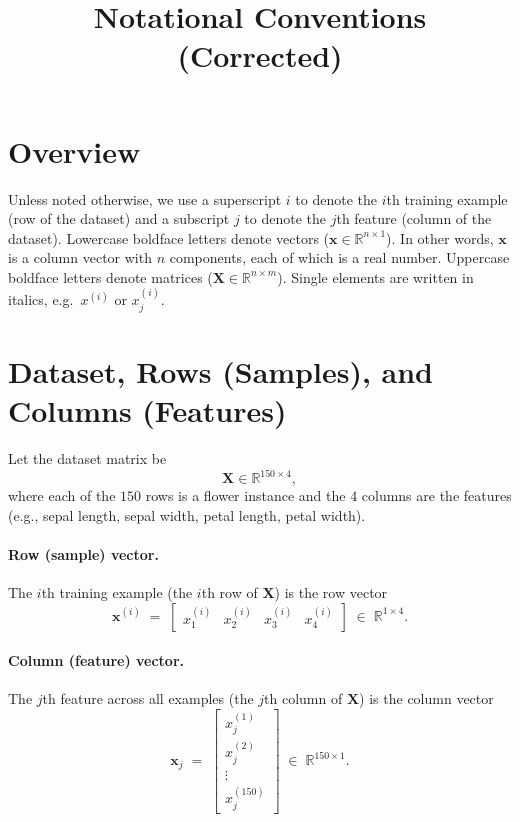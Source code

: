 \documentclass[11pt]{article}
\title{Notational Conventions (Corrected)}
\author{}
\date{}
\begin{document}
\maketitle

\section*{Overview}
Unless noted otherwise, we use a superscript $i$ to denote the $i$th training example (row of the dataset) and a subscript $j$ to denote the $j$th feature (column of the dataset). Lowercase boldface letters denote vectors ($\bm{x} \in \mathbb{R}^{n \times 1}$). In other words, $\bm{x}$ is a column vector with $n$ components, each of which is a real number. Uppercase boldface letters denote matrices ($\bm{X} \in \mathbb{R}^{n \times m}$). Single elements are written in italics, e.g.\ $x^{(i)}$ or $x^{(i)}_j$.

\section*{Dataset, Rows (Samples), and Columns (Features)}
Let the dataset matrix be
\begin{equation*}
  \bm{X} \in \mathbb{R}^{150 \times 4},
\end{equation*}
where each of the $150$ rows is a flower instance and the $4$ columns are the features (e.g., sepal length, sepal width, petal length, petal width).

\paragraph{Row (sample) vector.}
The $i$th training example (the $i$th row of $\bm{X}$) is the row vector
\begin{equation*}
  \bm{x}^{(i)} \;=\; \begin{bmatrix} x^{(i)}_1 & x^{(i)}_2 & x^{(i)}_3 & x^{(i)}_4 \end{bmatrix}
  \;\in\; \mathbb{R}^{1 \times 4}.
\end{equation*}

\paragraph{Column (feature) vector.}
The $j$th feature across all examples (the $j$th column of $\bm{X}$) is the column vector
\begin{equation*}
  \bm{x}_{j} \;=\; \begin{bmatrix}
    x^{(1)}_{j} \\[2pt]
    x^{(2)}_{j} \\
    \vdots \\
    x^{(150)}_{j}
  \end{bmatrix}
  \;\in\; \mathbb{R}^{150 \times 1}.
\end{equation*}
\end{document}
